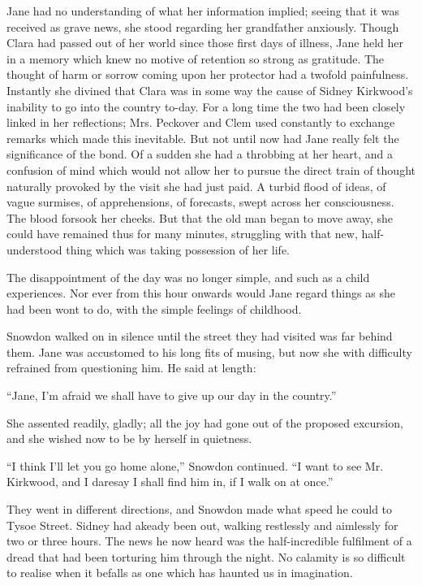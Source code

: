 Jane had no understanding of what her information implied; seeing that
it was received as grave news, she stood regarding her grandfather
anxiously. Though Clara had passed out of her world since those first
days of illness, Jane held her in a memory which knew no motive of
retention so strong as gratitude. The thought of harm or sorrow coming
upon her protector had a twofold painfulness. Instantly she divined that
Clara was in some way the cause of Sidney Kirkwood's inability to go
into the country to-day. For a long time the two had been closely linked
in her reflections; Mrs. Peckover and Clem used constantly to exchange
remarks which made this inevitable. But not until now had Jane really
felt the significance of the bond. Of a sudden she had a throbbing at
her heart, and a confusion of mind which would not allow her to pursue
the direct train of thought naturally provoked by the visit she had just
paid. A turbid flood of ideas, of {\protect\hypertarget{278}{}{}}vague
surmises, of apprehensions, of forecasts, swept across her
consciousness. The blood forsook her cheeks. But that the old man began
to move away, she could have remained thus for many minutes, struggling
with that new, half-understood thing which was taking possession of her
life.

The disappointment of the day was no longer simple, and such as a child
experiences. Nor ever from this hour onwards would Jane regard things as
she had been wont to do, with the simple feelings of childhood.

Snowdon walked on in silence until the street they had visited was far
behind them. Jane was accustomed to his long fits of musing, but now she
with difficulty refrained from questioning him. He said at length:

``Jane, I'm afraid we shall have to give up our day in the country.''

She assented readily, gladly; all the joy had gone out of the proposed
excursion, and she wished now to be by herself in quietness.

``I think I'll let you go home alone,'' Snowdon continued. ``I want to
see Mr. {\protect\hypertarget{279}{}{}}Kirkwood, and I daresay I shall
find him in, if I walk on at once.''

They went in different directions, and Snowdon made what speed he could
to Tysoe Street. Sidney had akeady been out, walking restlessly and
aimlessly for two or three hours. The news he now heard was the
half-incredible fulfilment of a dread that had been torturing him
through the night. No calamity is so difficult to realise when it
befalls as one which has haunted us in imagination.

